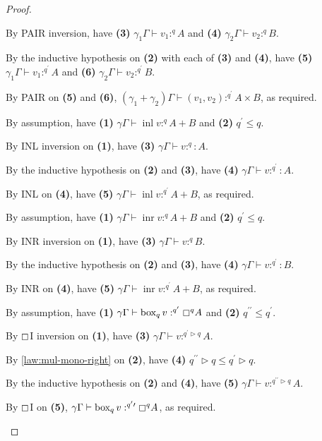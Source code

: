 \documentclass[acmsmall,screen,nonacm]{acmart}
\DeclareMathOperator{\bbox}{\text{box}}
\DeclareMathOperator{\inl}{\text{inl}}
\DeclareMathOperator{\inr}{\text{inr}}
\newcommand{\tee}{\vdash}
\DeclareMathOperator{\boxop}{\mathbin{\triangleright}}
\begin{document}
\begin{proof}
\begin{description}
    By PAIR inversion, have \textbf{(3)} $\gamma_1\Gamma \tee v_1 :^q A$ and \textbf{(4)} $\gamma_2\Gamma \tee v_2 :^q B$.

    By the inductive hypothesis on \textbf{(2)} with each of \textbf{(3)} and \textbf{(4)}, have \textbf{(5)} $\gamma_1\Gamma \tee v_1 :^{q^\prime} A$ and \textbf{(6)} $\gamma_2\Gamma \tee v_2 :^{q^\prime} B$.

    By PAIR on \textbf{(5)} and \textbf{(6)}, $(\gamma_1 + \gamma_2)\Gamma \tee (v_1, v_2) :^{q^\prime} A \times B$, as required.
    \\
    \item[Case INL.] 
    By assumption, have \textbf{(1)} $\gamma\Gamma \tee \inl v :^q A + B$ and \textbf{(2)} $q^\prime \le q$.

    By INL inversion on \textbf{(1)}, have \textbf{(3)} $\gamma\Gamma \tee v :^q : A$.

    By the inductive hypothesis on \textbf{(2)} and \textbf{(3)}, have \textbf{(4)} $\gamma\Gamma \tee v :^{q^\prime} : A$.

    By INL on \textbf{(4)}, have \textbf{(5)} $\gamma\Gamma \tee \inl v :^{q^\prime} A + B$, as required.
    \\
    \item[Case INR.] 
    By assumption, have \textbf{(1)} $\gamma\Gamma \tee \inr v :^q A + B$ and \textbf{(2)} $q^\prime \le q$.

    By INR inversion on \textbf{(1)}, have \textbf{(3)} $\gamma\Gamma \tee v :^q B$.

    By the inductive hypothesis on \textbf{(2)} and \textbf{(3)}, have \textbf{(4)} $\gamma\Gamma \tee v :^{q^\prime} : B$.

    By INR on \textbf{(4)}, have \textbf{(5)} $\gamma\Gamma \tee \inr v :^{q^\prime} A + B$, as required.
    \\
    \item[Case $\boxempty$I.]
    By assumption, have \textbf{(1)} $\gamma\Gamma \tee \bbox_q v :^{q^\prime} \boxempty^q A$ and \textbf{(2)} $q^{\prime\prime} \le q^\prime$.

    By $\boxempty$I inversion on \textbf{(1)}, have \textbf{(3)} $\gamma\Gamma \tee v :^{q^\prime \boxop q} A$.

    By \ref{law:mul-mono-right} on \textbf{(2)}, have \textbf{(4)} $q^{\prime\prime} \boxop q \le q^\prime \boxop q$.

    By the inductive hypothesis on \textbf{(2)} and \textbf{(4)}, have \textbf{(5)} $\gamma\Gamma \tee v :^{q^{\prime\prime} \boxop q} A$.

    By $\boxempty$I on \textbf{(5)}, $\gamma\Gamma \tee \bbox_q v :^{q^\prime\prime} \boxempty^q A$, as required.
  \end{description}
\end{proof}
\end{document}
